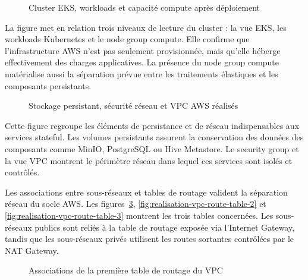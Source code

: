 \begin{figure}[H]
\centering
{}
\caption{Cluster EKS, workloads et capacité compute après déploiement}
\label{fig:realisation-eks-compute}
\end{figure}

La figure met en relation trois niveaux de lecture du cluster : la vue EKS, les workloads Kubernetes et le node group compute. Elle confirme que l'infrastructure AWS n'est pas seulement provisionnée, mais qu'elle héberge effectivement des charges applicatives. La présence du node group compute matérialise aussi la séparation prévue entre les traitements élastiques et les composants persistants.

\begin{figure}[H]
\centering
{}
\caption{Stockage persistant, sécurité réseau et VPC AWS réalisés}
\label{fig:realisation-network-storage}
\end{figure}

Cette figure regroupe les éléments de persistance et de réseau indispensables aux services stateful. Les volumes persistants assurent la conservation des données des composants comme MinIO, PostgreSQL ou Hive Metastore. Le security group et la vue VPC montrent le périmètre réseau dans lequel ces services sont isolés et contrôlés.

Les associations entre sous-réseaux et tables de routage valident la séparation réseau du socle AWS. Les figures~\ref{fig:realisation-vpc-route-table-1}, \ref{fig:realisation-vpc-route-table-2} et \ref{fig:realisation-vpc-route-table-3} montrent les trois tables concernées. Les sous-réseaux publics sont reliés à la table de routage exposée via l'Internet Gateway, tandis que les sous-réseaux privés utilisent les routes sortantes contrôlées par le NAT Gateway.

\begin{figure}[H]
\centering
{}
\caption{Associations de la première table de routage du VPC}
\label{fig:realisation-vpc-route-table-1}
\end{figure}

